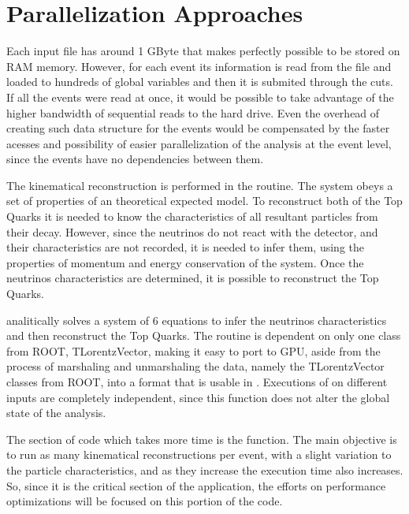 \chapter{Parallelization Approaches}
\label{ParallelizationApproaches}






Each input file has around 1 GByte that makes perfectly possible to be stored on RAM memory. However, for each event its information is read from the file and loaded to hundreds of global variables and then it is submited through the cuts. If all the events were read at once, it would be possible to take advantage of the higher bandwidth of sequential reads to the hard drive. Even the overhead of creating such data structure for the events would be compensated by the faster acesses and possibility of easier parallelization of the analysis at the event level, since the events have no dependencies between them.



The kinematical reconstruction is performed in the \dilep routine. The \ttbar system obeys a set of properties of an theoretical expected model. To reconstruct both of the Top Quarks it is needed to know the characteristics of all resultant particles from their decay. However, since the neutrinos do not react with the detector, and their characteristics are not recorded, it is needed to infer them, using the properties of momentum and energy conservation of the system. Once the neutrinos characteristics are determined, it is possible to reconstruct the Top Quarks.

\dilep analitically solves a system of 6 equations to infer the neutrinos characteristics and then reconstruct the Top Quarks. The routine is dependent on only one class from ROOT, TLorentzVector, making it easy to port to GPU, aside from the process of marshaling and unmarshaling the data, namely the TLorentzVector classes from ROOT, into a format that is usable in \cuda. Executions of \dilep on different inputs are completely independent, since this function does not alter the global state of the \tth analysis.









The section of code which takes more time is the \ttDilepKinFit function. The main objective is to run as many kinematical reconstructions per event, with a slight variation to the particle characteristics, and as they increase the \ttDilepKinFit execution time also increases. So, since it is the critical section of the application, the efforts on performance optimizations will be focused on this portion of the code.

